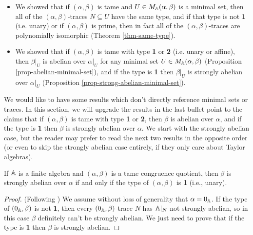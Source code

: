 \begin{appendices}
\begin{itemize}
\item We showed that if $(\alpha, \beta)$ is tame and $U \in M_{\mathbb{A}}(\alpha, \beta)$ is a minimal set, then all of the $(\alpha,\beta)$-traces $N \subseteq U$ have the same type, and if that type is not \textbf{1} (i.e. unary) or if $(\alpha, \beta)$ is prime, then in fact all of the $(\alpha, \beta)$-traces are polynomially isomorphic (Theorem \ref{thm-same-type}).

\item We showed that if $(\alpha, \beta)$ is tame with type \textbf{1} or \textbf{2} (i.e. unary or affine), then $\beta|_U$ is abelian over $\alpha|_U$ for any minimal set $U \in M_{\mathbb{A}}(\alpha, \beta)$ (Proposition \ref{prop-abelian-minimal-set}), and if the type is \textbf{1} then $\beta|_U$ is strongly abelian over $\alpha|_U$ (Proposition \ref{prop-strong-abelian-minimal-set}).
\end{itemize}

We would like to have some results which don't directly reference minimal sets or traces. In this section, we will upgrade the results in the last bullet point to the claims that if $(\alpha, \beta)$ is tame with type \textbf{1} or \textbf{2}, then $\beta$ is abelian over $\alpha$, and if the type is \textbf{1} then $\beta$ is strongly abelian over $\alpha$. We start with the strongly abelian case, but the reader may prefer to read the next two results in the opposite order (or even to skip the strongly abelian case entirely, if they only care about Taylor algebras).

\begin{thm}\label{type-strong-abelian} If $\mathbb{A}$ is a finite algebra and $(\alpha, \beta)$ is a tame congruence quotient, then $\beta$ is strongly abelian over $\alpha$ if and only if the type of $(\alpha, \beta)$ is \textbf{1} (i.e., unary).
\end{thm}
\begin{proof} (Following \cite{hobby-mckenzie}) We assume without loss of generality that $\alpha = 0_{\mathbb{A}}$. If the type of $(0_{\mathbb{A}}, \beta)$ is not \textbf{1}, then every $(0_{\mathbb{A}},\beta)$-trace $N$ has $\mathbb{A}|_N$ not strongly abelian, so in this case $\beta$ definitely can't be strongly abelian. We just need to prove that if the type is \textbf{1} then $\beta$ is strongly abelian.


\end{proof}
\end{appendices}
